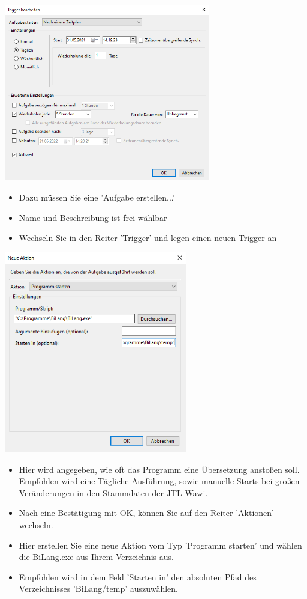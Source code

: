 \begin{center}
	\includegraphics[width=9cm]{./img/Aufgabenplanung3.png}
\end{center}

\begin{itemize}
	\item Dazu müssen Sie eine 'Aufgabe erstellen...'
	\item Name und Beschreibung ist frei wählbar
	\item Wechseln Sie in den Reiter 'Trigger' und legen einen neuen Trigger an
\end{itemize}

\begin{center}
	\includegraphics[width=8cm]{./img/Aufgabenplanung2.png}
\end{center}

\begin{itemize}
	\item Hier wird angegeben, wie oft das Programm eine Übersetzung anstoßen soll. Empfohlen wird eine Tägliche Ausführung, sowie manuelle Starts bei großen Veränderungen in den Stammdaten der JTL-Wawi.
	\item Nach eine Bestätigung mit OK, können Sie auf den Reiter 'Aktionen' wechseln. 
	\item Hier erstellen Sie eine neue Aktion vom Typ 'Programm starten' und wählen die BiLang.exe aus Ihrem Verzeichnis aus.
	\item Empfohlen wird in dem Feld 'Starten in' den absoluten Pfad des Verzeichnisses 'BiLang/temp' auszuwählen.
\end{itemize}